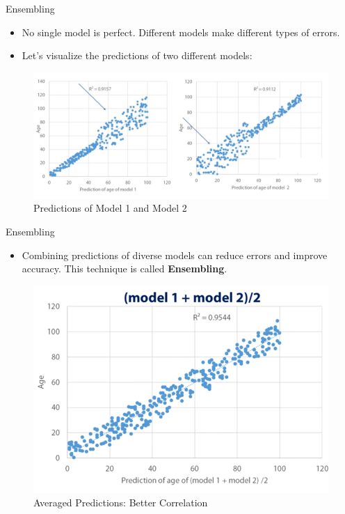 \begin{frame}{Ensembling}
\begin{itemize}
    \item No single model is perfect. Different models make different types of errors.
    \item Let's visualize the predictions of two different models:
\end{itemize}
\begin{figure}
    \centering
    \includegraphics[width=1.0\linewidth]{images/ensembling1.png} 
    \caption{Predictions of Model 1 and Model 2}
\end{figure}
\end{frame}

\begin{frame}{Ensembling}
\begin{itemize}
    \item Combining predictions of diverse models can reduce errors and improve accuracy. This technique is called \textbf{Ensembling}.
\end{itemize}
\begin{figure}
    \centering
    \includegraphics[width=0.7\linewidth]{images/ensembling2.png} 
    \caption{Averaged Predictions: Better Correlation}
\end{figure}
\end{frame}

